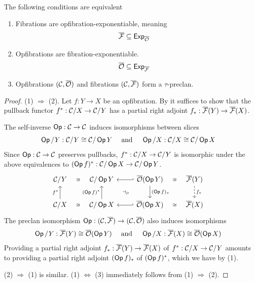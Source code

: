 \begin{proposition}\label{prop:exponentiability-opposite}
  The following conditions are equivalent
  \begin{enumerate}
  \item Fibrations are opfibration-exponentiable, meaning
    \[ {\overline{{\mathcal{F}}}} \subseteq \mathsf{Exp}_{\overline{{\mathcal{O}}}} \]
  \item Opfibrations are fibration-exponentiable.
    \[{\overline{{\mathcal{O}}}} \subseteq \mathsf{Exp}_{\overline{{\mathcal{F}}}}\]
  \item Opfibrations $(\mathcal{C},{\overline{{\mathcal{O}}}})$ and fibrations $(\mathcal{C},{\overline{{\mathcal{F}}}})$ form a $\tau$-preclan.
  \end{enumerate}
\end{proposition}
\begin{proof}
  (1) $\Rightarrow$ (2).
  Let $f : Y \to X$ be an opfibration.
  By 
  it suffices to show that the pullback functor $f^* : \mathcal{C} / X \to \mathcal{C} / Y$
  has a partial right adjoint $f_* : {\overline{{\mathcal{F}}}}(Y) \to {\overline{{\mathcal{F}}}}(X)$.

  The self-inverse $\mathop{\mathsf{Op}} : \mathcal{C} \to \mathcal{C}$ induces isomorphisms between slices
  \[\mathop{\mathsf{Op}} / Y : \mathcal{C} / Y \cong \mathcal{C} / \mathop{\mathsf{Op}}{Y} 
  \quad \text{ and } \quad
  \mathop{\mathsf{Op}} / X : \mathcal{C} / X \cong \mathcal{C} / \mathop{\mathsf{Op}}{X} \]
  Since $\mathop{\mathsf{Op}} : \mathcal{C} \to \mathcal{C}$ preserves pullbacks,
  $f^* : \mathcal{C} / X \to \mathcal{C} / Y$
  is isomorphic under the above equivalences to
  $(\mathop{\mathsf{Op}}{f})^* : \mathcal{C} / \mathop{\mathsf{Op}}{X} \to \mathcal{C} / \mathop{\mathsf{Op}}{Y}$.
  \[
  \begin{tikzcd}
    {\CC / {Y}} & {\CC / \Op{Y}} & {\opfib(\Op{Y})} & {\fib(Y)} \\
    {\CC / {X}} & {\CC / \Op{X}} & {\opfib(\Op{X})} & {\fib(X)}
    \arrow["\iso"{description}, draw=none, from=1-1, to=1-2]
    \arrow[hook', from=1-3, to=1-2]
    \arrow["\iso"{description}, draw=none, from=1-3, to=1-4]
    \arrow[""{name=0, anchor=center, inner sep=0}, "{(\Op{f})_*}", from=1-3, to=2-3]
    \arrow["{f_*}", dashed, from=1-4, to=2-4]
    \arrow["{f^*}", from=2-1, to=1-1]
    \arrow["\iso"{description}, draw=none, from=2-1, to=2-2]
    \arrow[""{name=1, anchor=center, inner sep=0}, "{(\Op{f})^*}", from=2-2, to=1-2]
    \arrow[hook', from=2-3, to=2-2]
    \arrow["\iso"{description}, draw=none, from=2-3, to=2-4]
    \arrow["{\dashv_\partial}"{description}, draw=none, from=1, to=0]
  \end{tikzcd}
  \]
  The preclan isomorphism
  $\mathop{\mathsf{Op}} : (\mathcal{C}, {\overline{{\mathcal{F}}}}) \to (\mathcal{C}, {\overline{{\mathcal{O}}}})$
  also induces isomorphisms
  \[
  \mathop{\mathsf{Op}}{} / Y : {\overline{{\mathcal{F}}}}(Y) \cong {\overline{{\mathcal{O}}}}(\mathop{\mathsf{Op}}{Y})
  \quad \text{ and } \quad
  \mathop{\mathsf{Op}}{} / X : {\overline{{\mathcal{F}}}}(X) \cong {\overline{{\mathcal{O}}}}(\mathop{\mathsf{Op}}{X})
  \]
  Providing a partial right adjoint
  $f_* : {\overline{{\mathcal{F}}}}(Y) \to {\overline{{\mathcal{F}}}}(X)$ of $f^* : \mathcal{C} / X \to \mathcal{C} / Y$
  amounts to providing a partial right adjoint
  $(\mathop{\mathsf{Op}}{f})_*$ of $(\mathop{\mathsf{Op}}{f})^*$, which we have by (1).
  
  (2) $\Rightarrow$ (1) is similar.
  (1) $\Leftrightarrow$ (3) immediately follows from (1) $\Rightarrow$ (2).
\end{proof}

